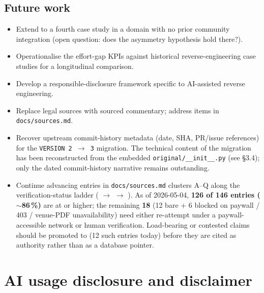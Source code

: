 \documentclass[11pt,a4paper]{article}
\begin{document}
\subsection{Future work}
\label{sec:future-work}
\begin{itemize}
  \item Extend to a fourth case study in a domain with no prior
        community integration (open question: does the asymmetry
        hypothesis hold there?).
  \item Operationalise the effort-gap KPIs against historical
        reverse-engineering case studies for a longitudinal comparison.
  \item Develop a responsible-disclosure framework specific to AI-assisted
        reverse engineering.
  \item Replace  legal
        sources with sourced commentary; address
         items in
        \texttt{docs/sources.md}.
  \item Recover upstream 
        commit-history metadata (date, SHA, PR/issue references) for
        the \texttt{VERSION 2\,$\to$\,3} migration. The technical
        content of the migration has been reconstructed from the
        embedded \texttt{original/\_\_init\_\_.py} (see \S3.4); only
        the dated commit-history narrative remains outstanding.
  \item Continue advancing entries in \texttt{docs/sources.md}
        clusters A--Q along the verification-status ladder
        ( $\rightarrow$
        \seqsplit{\texttt{[ai-confirmed]}} $\rightarrow$
        ). As of 2026-05-04,
        \textbf{126 of 146 entries ($\sim$86\,\%)} are at
        \seqsplit{\texttt{[ai-confirmed]}} or higher; the remaining
        \textbf{18} (12 bare  +
        6  blocked
        on paywall / 403 / venue-PDF unavailability) need either
        re-attempt under a paywall-accessible network or human
        verification. Load-bearing or contested claims should be
        promoted to  (12 such entries
        today) before they are cited as authority rather than as a
        database pointer.
\end{itemize}

\section{AI usage disclosure and disclaimer}
\label{sec:ai-disclosure}
\end{document}
